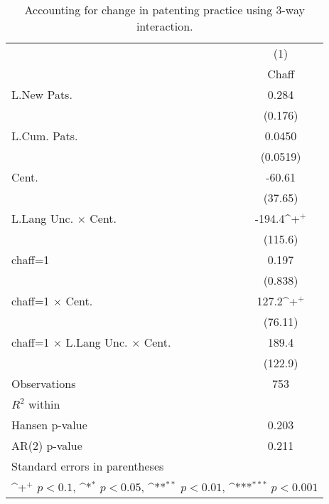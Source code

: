 \begin{table}
\begin{center}
\caption[Structural Break in Patenting Activity]{Accounting for change in patenting practice using 3-way interaction.\label{chaff}}
\vspace{0.3in}
{
\def\sym#1{\ifmmode^{#1}\else\(^{#1}\)\fi}
\begin{tabular}{l*{1}{c}}
\hline\hline
                    &\multicolumn{1}{c}{(1)}\\
                    &\multicolumn{1}{c}{Chaff}\\
\hline
L.New Pats.         &       0.284         \\
                    &     (0.176)         \\
L.Cum. Pats.        &      0.0450         \\
                    &    (0.0519)         \\
Cent.               &      -60.61         \\
                    &     (37.65)         \\
L.Lang Unc. $\times$ Cent.&      -194.4\sym{+}  \\
                    &     (115.6)         \\
chaff=1             &       0.197         \\
                    &     (0.838)         \\
chaff=1 $\times$ Cent.&       127.2\sym{+}  \\
                    &     (76.11)         \\
chaff=1 $\times$ L.Lang Unc. $\times$ Cent.&       189.4         \\
                    &     (122.9)         \\
\hline
Observations        &         753         \\
$R^2$ within               &                     \\
Hansen p-value             &       0.203         \\
AR(2) p-value                &       0.211         \\
\hline\hline
\multicolumn{2}{l}{\footnotesize Standard errors in parentheses}\\
\multicolumn{2}{l}{\footnotesize \sym{+} \(p<0.1\), \sym{*} \(p<0.05\), \sym{**} \(p<0.01\), \sym{***} \(p<0.001\)}\\
\end{tabular}
}
\end{center}
\end{table}



